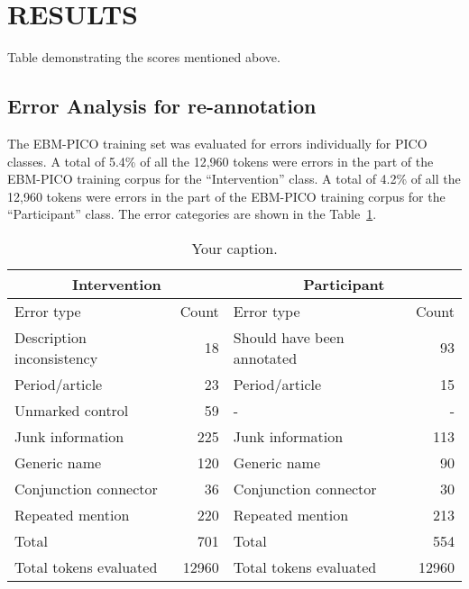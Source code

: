 \documentclass[10.7pt,]{article}
\begin{document}
\section{RESULTS}\label{results}
%
Table demonstrating the scores mentioned above.
%
%
%
\subsection{Error Analysis for re-annotation}\label{subsec:err}
%
The EBM-PICO training set was evaluated for errors individually for PICO classes.
A total of 5.4\% of all the 12,960 tokens were errors in the part of the EBM-PICO training corpus for the ``Intervention'' class.
A total of 4.2\% of all the 12,960 tokens were errors in the part of the EBM-PICO training corpus for the ``Participant'' class.
The error categories are shown in the Table~\ref{tab:errordist}.


\begin{table}[!ht]
    \centering
    \begin{tabular}{|l|r|l|r|}
    \hline
    \multicolumn{2}{|c|}{Intervention} & \multicolumn{2}{|c|}{Participant} \\
    \hline
    Error type & Count & Error type & Count\\
    \hline
        Description inconsistency & 18 & Should have been annotated & 93 \\
        Period/article & 23 & Period/article & 15 \\ 
        Unmarked control & 59 & - & - \\ 
        Junk information & 225 & Junk information & 113 \\ 
        Generic name & 120 & Generic name & 90 \\ 
        Conjunction connector & 36 & Conjunction connector & 30 \\ 
        Repeated mention & 220 & Repeated mention & 213 \\ 
        Total & 701 & Total & 554 \\ 
        Total tokens evaluated & 12960 & Total tokens evaluated & 12960 \\ \hline
    \end{tabular}
    \caption{\label{tab:errordist} Your caption.}
\end{table}
%
%
%
\end{document}
